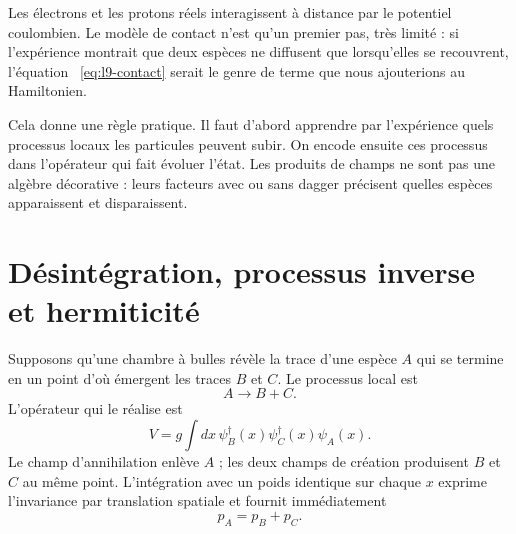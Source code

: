 Les électrons et les protons réels interagissent à distance par le potentiel coulombien. Le modèle de contact n’est qu’un premier pas, très limité : si l’expérience montrait que deux espèces ne diffusent que lorsqu’elles se recouvrent, l’équation ~\eqref{eq:l9-contact} serait le genre de terme que nous ajouterions au Hamiltonien.

\begin{classroomqa}
\end{classroomqa}

Cela donne une règle pratique. Il faut d’abord apprendre par l’expérience quels processus locaux les particules peuvent subir. On encode ensuite ces processus dans l’opérateur qui fait évoluer l’état. Les produits de champs ne sont pas une algèbre décorative : leurs facteurs avec ou sans dagger précisent quelles espèces apparaissent et disparaissent.

\section{Désintégration, processus inverse et hermiticité}

Supposons qu’une chambre à bulles révèle la trace d’une espèce \(A\) qui se termine en un point d’où émergent les traces \(B\) et \(C\). Le processus local est
\begin{equation}
A\longrightarrow B+C.
\end{equation}
L’opérateur qui le réalise est
\begin{equation}
V=g\int dx\,
\psi_B^\dagger(x)\psi_C^\dagger(x)\psi_A(x).
\label{eq:l9-decay-half}
\end{equation}
Le champ d’annihilation enlève \(A\) ; les deux champs de création produisent \(B\) et \(C\) au même point. L’intégration avec un poids identique sur chaque \(x\) exprime l’invariance par translation spatiale et fournit immédiatement
\begin{equation}
p_A=p_B+p_C.
\end{equation}

